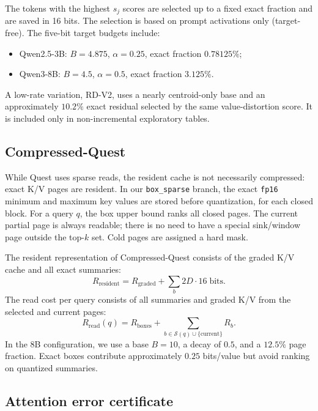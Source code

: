 \documentclass[10pt,twocolumn]{article}
\newcommand{\bpv}{bits/value}
\begin{document}
The tokens with the highest $s_j$ scores are selected up to a fixed exact fraction and are saved in 16 bits. The selection is based on prompt activations only (target-free). The five-bit target budgets include:
\begin{itemize}\itemsep1pt
\item Qwen2.5-3B: $B=4.875$, $\alpha=0.25$, exact fraction $0.78125\%$;
\item Qwen3-8B: $B=4.5$, $\alpha=0.5$, exact fraction $3.125\%$.
\end{itemize}

A low-rate variation, RD-V2, uses a nearly centroid-only base and an approximately $10.2\%$ exact residual selected by the same value-distortion score. It is included only in non-incremental exploratory tables.
\subsection{Compressed-Quest}

While Quest uses sparse reads, the resident cache is not necessarily compressed: exact K/V pages are resident. In our \texttt{box\_sparse} branch, the exact \texttt{fp16} minimum and maximum key values are stored before quantization, for each closed block. For a query $q$, the box upper bound ranks all closed pages. The current partial page is always readable; there is no need to have a special sink/window page outside the top-$k$ set. Cold pages are assigned a hard mask.

The resident representation of Compressed-Quest consists of the graded K/V cache and all exact summaries:
\begin{equation}
R_{\mathrm{resident}}
=R_{\mathrm{graded}}+\sum_b 2D\cdot16\;\text{bits}.
\end{equation}
The read cost per query consists of all summaries and graded K/V from the selected and current pages:
\begin{equation}
R_{\mathrm{read}}(q)
=R_{\mathrm{boxes}}+
\sum_{b\in\mathcal{S}(q)\cup\{\mathrm{current}\}}R_b.
\end{equation}
In the 8B configuration, we use a base $B=10$, a decay of $0.5$, and a $12.5\%$ page fraction. Exact boxes contribute approximately $0.25$ \bpv{} but avoid ranking on quantized summaries.


\subsection{Attention error certificate}
\end{document}
